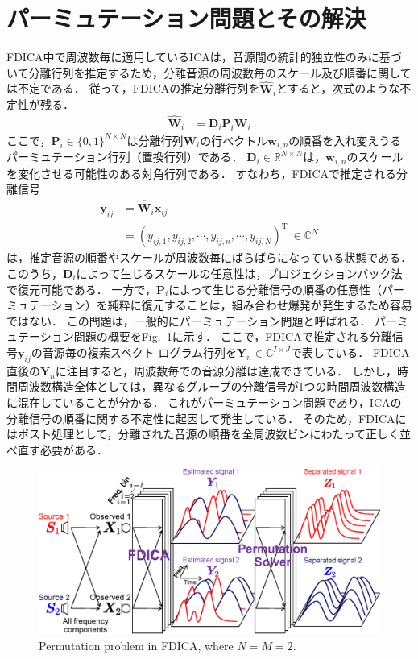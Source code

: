\section{パーミュテーション問題とその解決}
\label{sec:pp}
FDICA中で周波数毎に適用しているICAは，音源間の統計的独立性のみに基づいて分離行列を推定するため，分離音源の周波数毎のスケール及び順番に関しては不定である．
従って，FDICAの推定分離行列を$\hat{\bm{W}}_i$とすると，次式のような不定性が残る．
\begin{align}
	\hat{\bm{W}}_{i} &= \bm{D}_{i}\bm{P}_{i}  \bm{W}_{i}
\end{align}
ここで，$\bm{P}_i \in \{0, 1\}^{N \times N}$は分離行列$\bm{W}_{i}$の行ベクトル$\bm{w}_{i, n}$の順番を入れ変えうるパーミュテーション行列（置換行列）である．
$\bm{D}_i \in \mathbb{R}^{N \times N}$は，$\bm{w}_{i,n}$のスケールを変化させる可能性のある対角行列である．
すなわち，FDICAで推定される分離信号
\begin{align}
\bm{y}_{ij} &= \hat{\bm{W}}_i\bm{x}_{ij} \\
&=\left( y_{ij,1},y_{ij,2}, \cdots, y_{ij,n}, \cdots, y_{ij,N} \right)^\mathrm{T}~\in \mathbb{C}^{N} \label{eq:sepSig}
\end{align}
は，推定音源の順番やスケールが周波数毎にばらばらになっている状態である．
このうち，$\bm{D}_i$によって生じるスケールの任意性は，プロジェクションバック法\cite{Matsuoka2001_PB}で復元可能である．
一方で，$\bm{P}_i$によって生じる分離信号の順番の任意性（パーミュテーション）を純粋に復元することは，組み合わせ爆発が発生するため容易ではない．
この問題は，一般的にパーミュテーション問題と呼ばれる．
パーミュテーション問題の概要をFig.~\ref{fig:permu}に示す．
ここで，FDICAで推定される分離信号$\bm{y}_{ij}$の音源毎の複素スペクト
ログラム行列を$\bm{Y}_n \in \mathbb{C}^{I \times J}$で表している．
FDICA直後の$\bm{Y}_n$に注目すると，周波数毎での音源分離は達成できている．
しかし，時間周波数構造全体としては，異なるグループの分離信号が1つの時間周波数構造に混在していることが分かる．
これがパーミュテーション問題であり，ICAの分離信号の順番に関する不定性に起因して発生している．
そのため，FDICAにはポスト処理として，分離された音源の順番を全周波数ビンにわたって正しく並べ直す必要がある．
\begin{figure}[t]
    \begin{center}
        \includegraphics[width=0.95\columnwidth]{figures/permutation_image.eps}
    \end{center}
    \vspace{-8pt}
	\caption{Permutation problem in FDICA, where $N=M=2$.}
	\label{fig:permu}
\end{figure}


